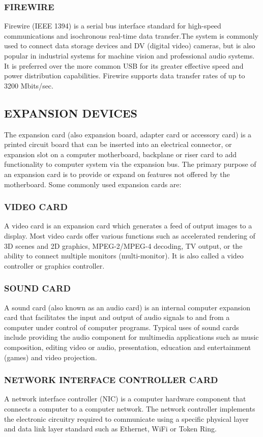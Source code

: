 \documentclass[a4paper,28pt]{report}
\begin{document}
\subsubsection*{FIREWIRE}
	 Firewire (IEEE 1394) is a serial bus interface standard for high-speed communications
	and isochronous real-time data transfer.The system is commonly used to connect data storage
	devices and DV (digital video) cameras, but is also popular in industrial systems for machine vision and
	professional audio systems. It is preferred over the more common USB for its greater effective speed and
	power distribution capabilities. Firewire supports data transfer rates of up to 3200 Mbits/sec.
\subsection*{EXPANSION DEVICES}
	The expansion card (also expansion board, adapter card or accessory card) is a printed circuit board that can
	be inserted into an electrical connector, or expansion slot on a computer motherboard, backplane or riser card to
	add functionality to computer system via the expansion bus. The primary purpose of an expansion card is to
	provide or expand on features not offered by the motherboard. Some commonly used expansion cards are:
\subsubsection*{VIDEO CARD} 
	A video card is an expansion card which generates a feed of output images to a display.
	Most video cards offer various functions such as accelerated rendering of 3D scenes and 2D graphics,
	MPEG-2/MPEG-4 decoding, TV output, or the ability to connect multiple monitors (multi-monitor). It is
	also called a video controller or graphics controller.
\subsubsection*{SOUND CARD}
	 A sound card (also known as an audio card) is an internal computer expansion card that
	facilitates the input and output of audio signals to and from a computer under control of computer
	programs. Typical uses of sound cards include providing the audio component for multimedia applications
	such as music composition, editing video or audio, presentation, education and entertainment (games) and
	video projection.
\subsubsection*{ NETWORK INTERFACE CONTROLLER CARD}
	 A network interface controller (NIC) is a computer hardware component
	that connects a computer to a computer network. The network controller implements the electronic circuitry
	required to communicate using a specific physical layer and data link layer standard such as Ethernet, WiFi
	or Token Ring.
\end{document}
